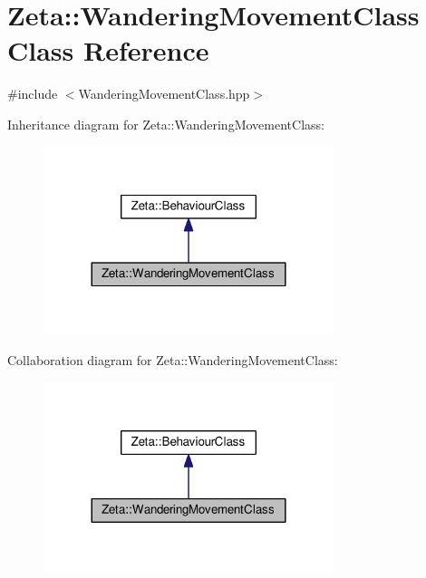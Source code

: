 \hypertarget{classZeta_1_1WanderingMovementClass}{\section{Zeta\+:\+:Wandering\+Movement\+Class Class Reference}
\label{classZeta_1_1WanderingMovementClass}
}


{\ttfamily \#include $<$Wandering\+Movement\+Class.\+hpp$>$}



Inheritance diagram for Zeta\+:\+:Wandering\+Movement\+Class\+:\nopagebreak
\begin{figure}[H]
\begin{center}
\leavevmode
\includegraphics[width=240pt]{classZeta_1_1WanderingMovementClass__inherit__graph}
\end{center}
\end{figure}


Collaboration diagram for Zeta\+:\+:Wandering\+Movement\+Class\+:\nopagebreak
\begin{figure}[H]
\begin{center}
\leavevmode
\includegraphics[width=240pt]{classZeta_1_1WanderingMovementClass__coll__graph}
\end{center}
\end{figure}
